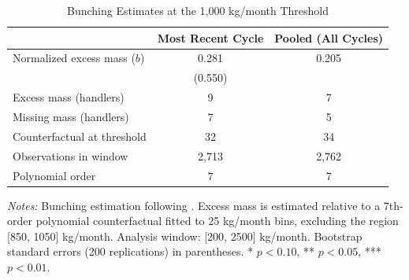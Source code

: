 \begin{table}[H]
\centering
\caption{Bunching Estimates at the 1,000 kg/month Threshold}
\begin{threeparttable}
\begin{tabular}{lcc}
\toprule
& Most Recent Cycle & Pooled (All Cycles) \\
\midrule
Normalized excess mass ($b$) & 0.281 & 0.205 \\
& (0.550) & \\
Excess mass (handlers) & 9 & 7 \\
Missing mass (handlers) & 7 & 5 \\
\midrule
Counterfactual at threshold & 32 & 34 \\
Observations in window & 2,713 & 2,762 \\
Polynomial order & 7 & 7 \\
\bottomrule
\end{tabular}
\begin{tablenotes}[flushleft]
\small
\item \textit{Notes:} Bunching estimation following \citet{kleven2013}. Excess mass is estimated relative to a 7th-order polynomial counterfactual fitted to 25 kg/month bins, excluding the region [850, 1050] kg/month. Analysis window: [200, 2500] kg/month. Bootstrap standard errors (200 replications) in parentheses. * $p<0.10$, ** $p<0.05$, *** $p<0.01$.
\end{tablenotes}
\end{threeparttable}
\label{tab:bunching}
\end{table}
